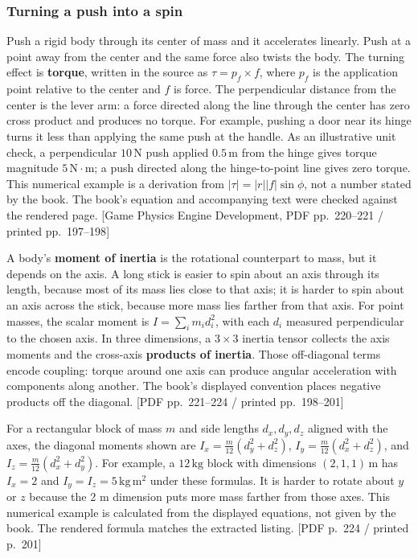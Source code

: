 \subsubsection{Turning a push into a spin}\label{06-engine-ii-ch033-turning-a-push-into-a-spin}

Push a rigid body through its center of mass and it accelerates linearly. Push at a point away from the center and the same force also twists the body. The turning effect is \textbf{torque}, written in the source as \(\tau = p_f \times f\), where \(p_f\) is the application point relative to the center and \(f\) is force. The perpendicular distance from the center is the lever arm: a force directed along the line through the center has zero cross product and produces no torque. For example, pushing a door near its hinge turns it less than applying the same push at the handle. As an illustrative unit check, a perpendicular \(10\,\mathrm{N}\) push applied \(0.5\,\mathrm{m}\) from the hinge gives torque magnitude \(5\,\mathrm{N\cdot m}\); a push directed along the hinge-to-point line gives zero torque. This numerical example is a derivation from \(|\tau|=|r||f|\sin\phi\), not a number stated by the book. The book's equation and accompanying text were checked against the rendered page. {[}Game Physics Engine Development, PDF pp.~220--221 / printed pp.~197--198{]}

A body's \textbf{moment of inertia} is the rotational counterpart to mass, but it depends on the axis. A long stick is easier to spin about an axis through its length, because most of its mass lies close to that axis; it is harder to spin about an axis across the stick, because more mass lies farther from that axis. For point masses, the scalar moment is \(I=\sum_i m_i d_i^2\), with each \(d_i\) measured perpendicular to the chosen axis. In three dimensions, a \(3\times3\) inertia tensor collects the axis moments and the cross-axis \textbf{products of inertia}. Those off-diagonal terms encode coupling: torque around one axis can produce angular acceleration with components along another. The book's displayed convention places negative products off the diagonal. {[}PDF pp.~221--224 / printed pp.~198--201{]}

For a rectangular block of mass \(m\) and side lengths \(d_x,d_y,d_z\) aligned with the axes, the diagonal moments shown are \(I_x=\frac{m}{12}(d_y^2+d_z^2)\), \(I_y=\frac{m}{12}(d_x^2+d_z^2)\), and \(I_z=\frac{m}{12}(d_x^2+d_y^2)\). For example, a \(12\,\mathrm{kg}\) block with dimensions \((2,1,1)\,\mathrm{m}\) has \(I_x=2\) and \(I_y=I_z=5\,\mathrm{kg\,m^2}\) under these formulas. It is harder to rotate about \(y\) or \(z\) because the 2 m dimension puts more mass farther from those axes. This numerical example is calculated from the displayed equations, not given by the book. The rendered formula matches the extracted listing. {[}PDF p.~224 / printed p.~201{]}

